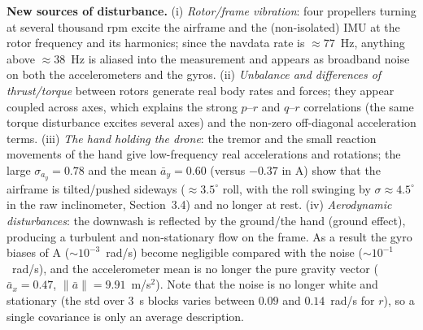 \textbf{New sources of disturbance.} (i) \emph{Rotor/frame vibration}: four propellers turning at several thousand rpm excite the
airframe and the (non-isolated) IMU at the rotor frequency and its harmonics; since the navdata rate is $\approx77$~Hz, anything above $\approx38$~Hz is
aliased into the measurement and appears as broadband noise on both the accelerometers and the gyros. (ii) \emph{Unbalance and differences of thrust/torque} between rotors
generate real body rates and forces; they appear coupled across axes, which explains the strong $p$--$r$ and $q$--$r$ correlations
(the same torque disturbance excites several axes) and the non-zero off-diagonal acceleration terms. (iii) \emph{The hand holding the drone}: the
tremor and the small reaction movements of the hand give low-frequency real accelerations and rotations; the large $\sigma_{a_y}=0.78$ and the mean $\bar a_y=0.60$ (versus $-0.37$ in A) show
that the airframe is tilted/pushed sideways ($\approx3.5^\circ$ roll, with the roll swinging by $\sigma\approx4.5^\circ$ in the raw inclinometer, Section~3.4) and no longer at rest. (iv) \emph{Aerodynamic disturbances}: the downwash is reflected by the ground/the
hand (ground effect), producing a turbulent and non-stationary flow on the frame. As a result the gyro biases of A ($\sim10^{-3}$~rad/s)
become negligible compared with the noise ($\sim10^{-1}$~rad/s), and the accelerometer mean is no longer the pure gravity vector ($\bar a_x=0.47$, $\|\bar a\|=9.91$~m/s$^2$).
Note that the noise is no longer white and stationary (the std over 3~s blocks varies between $0.09$ and $0.14$~rad/s for $r$), so a single
covariance is only an average description.
